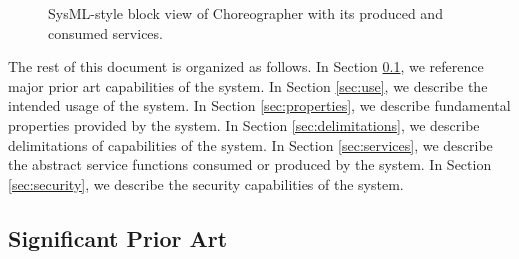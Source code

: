 \documentclass[a4paper]{arrowhead}
\begin{document}
\begin{figure}[ht!]
  \centering
  \caption{SysML-style block view of Choreographer with its produced and consumed services.}
  \label{fig:system}
\end{figure}

The rest of this document is organized as follows.
In Section \ref{sec:prior_art}, we reference major prior art capabilities of the system.
In Section \ref{sec:use}, we describe the intended usage of the system.
In Section \ref{sec:properties}, we describe fundamental properties provided by the system.
In Section \ref{sec:delimitations}, we describe delimitations of capabilities of the system.
In Section \ref{sec:services}, we describe the abstract service functions consumed or produced by the system.
In Section \ref{sec:security}, we describe the security capabilities of the system.

\newpage

\subsection{Significant Prior Art}
\label{sec:prior_art}
\end{document}

